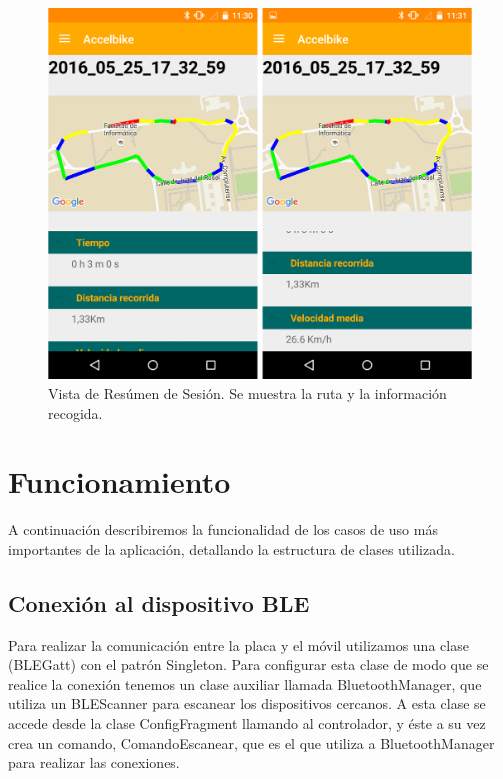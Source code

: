 \begin{figure}[h]%
	\centering
    \includegraphics[scale=0.2]{figures/app_resumen_sesion.png} %
    \caption[Vista de resumen de sesión]{Vista de Resúmen de Sesión. Se muestra la ruta y la información recogida.}
   	\label{figuraAPPSesion}
\end{figure}

\section{Funcionamiento}
\label{makereference6.2}

A continuación describiremos la funcionalidad de los casos de uso más importantes de la aplicación, detallando la estructura de clases utilizada.

\subsection{Conexión al dispositivo BLE}
\label{makereference6.2.1}

Para realizar la comunicación entre la placa y el móvil utilizamos una clase (BLEGatt) con el patrón Singleton. Para configurar esta clase de modo que se realice la conexión tenemos un clase auxiliar llamada BluetoothManager, que utiliza un BLEScanner para escanear los dispositivos cercanos. A esta clase se accede desde la clase ConfigFragment llamando al controlador, y éste a su vez crea un comando, ComandoEscanear, que es el que utiliza a BluetoothManager para realizar las conexiones. 


